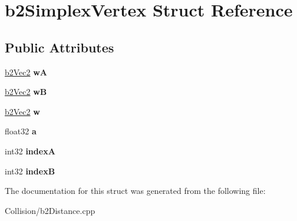 \hypertarget{structb2SimplexVertex}{}\section{b2\+Simplex\+Vertex Struct Reference}
\label{structb2SimplexVertex}
\subsection*{Public Attributes}
\begin{DoxyCompactItemize}
\item 
\mbox{\label{structb2SimplexVertex_a35098ec42d2615c7dc6d645e4a7c0674}} 
\mbox{\hyperlink{structb2Vec2}{b2\+Vec2}} {\bfseries wA}
\item 
\mbox{\label{structb2SimplexVertex_a73d6b5be3648a293b103d559e9d03534}} 
\mbox{\hyperlink{structb2Vec2}{b2\+Vec2}} {\bfseries wB}
\item 
\mbox{\label{structb2SimplexVertex_a32e374d7bbb6d8a0589a91bd3de3029f}} 
\mbox{\hyperlink{structb2Vec2}{b2\+Vec2}} {\bfseries w}
\item 
\mbox{\label{structb2SimplexVertex_ace99ab00d1d83a7290d283f73671e594}} 
float32 {\bfseries a}
\item 
\mbox{\label{structb2SimplexVertex_ac53c648f53d28391aaff758d99a7868d}} 
int32 {\bfseries indexA}
\item 
\mbox{\label{structb2SimplexVertex_a0c25e5f713707356122e91bd20e4f40c}} 
int32 {\bfseries indexB}
\end{DoxyCompactItemize}


The documentation for this struct was generated from the following file\+:\begin{DoxyCompactItemize}
\item 
Collision/b2\+Distance.\+cpp\end{DoxyCompactItemize}
